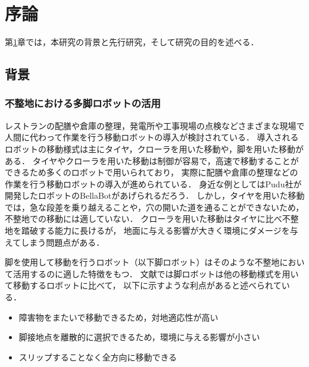 ﻿
\chapter{序論}\label{chapter:序論}
第\ref{chapter:序論}章では，本研究の背景と先行研究，そして研究の目的を述べる．


\section{背景}


\subsection{不整地における多脚ロボットの活用}
レストランの配膳や倉庫の整理，発電所や工事現場の点検などさまざまな現場で
人間に代わって作業を行う移動ロボットの導入が検討されている\cite{cita:news_robot}．
導入されるロボットの移動様式は主にタイヤ，クローラを用いた移動や，脚を用いた移動がある．
タイヤやクローラを用いた移動は制御が容易で，高速で移動することができるため多くのロボットで用いられており，
実際に配膳や倉庫の整理などの作業を行う移動ロボットの導入が進められている\cite{Sotnik_Prospects_for_Introduction}．
身近な例としてはPudu社が開発したロボットのBellaBot\cite{Pudu_BellaBot}があげられるだろう．
しかし，タイヤを用いた移動では，急な段差を乗り越えることや，穴の開いた道を通ることができないため，不整地での移動には適していない．
クローラを用いた移動はタイヤに比べ不整地を踏破する能力に長けるが，
地面に与える影響が大きく環境にダメージを与えてしまう問題点がある．

脚を使用して移動を行うロボット（以下脚ロボット）はそのような不整地において活用するのに適した特徴をもつ．
文献\cite{Locomotion_for_difficult_terrain}では脚ロボットは他の移動様式を用いて移動するロボットに比べて，
以下に示すような利点があると述べられている．

\begin{itemize}
  \item 障害物をまたいで移動できるため，対地適応性が高い
  \item 脚接地点を離散的に選択できるため，環境に与える影響が小さい
  \item スリップすることなく全方向に移動できる
\end{itemize}

